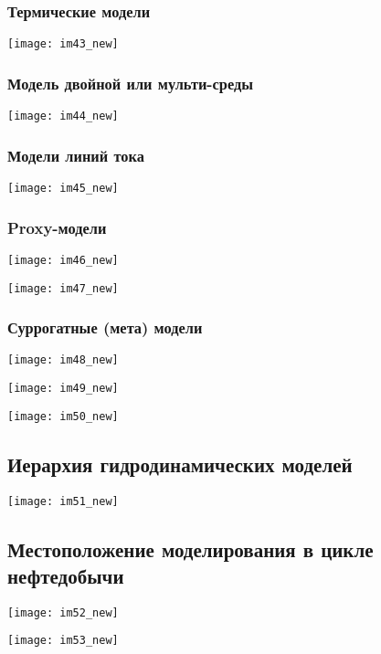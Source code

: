 \documentclass[main.tex]{subfiles}
\begin{document}
\subsubsection{Термические модели}

\texttt{[image: im43\_new]}

\subsubsection{Модель двойной или мульти-среды}

\texttt{[image: im44\_new]}

\subsubsection{Модели линий тока}

\texttt{[image: im45\_new]}

\subsubsection{Proxy-модели}

\texttt{[image: im46\_new]}

\texttt{[image: im47\_new]}

\subsubsection{Суррогатные (мета) модели}

\texttt{[image: im48\_new]}

\texttt{[image: im49\_new]}

\texttt{[image: im50\_new]}

\subsection{Иерархия гидродинамических моделей}

\texttt{[image: im51\_new]}

\subsection{Местоположение моделирования в цикле нефтедобычи}

\texttt{[image: im52\_new]}

\texttt{[image: im53\_new]}
\end{document}
